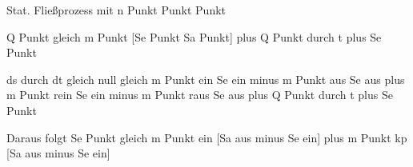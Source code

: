 Stat. Fließprozess mit n Punkt Punkt Punkt

Q Punkt gleich m Punkt [Se Punkt Sa Punkt] plus Q Punkt durch t plus Se Punkt

ds durch dt gleich null gleich m Punkt ein Se ein minus m Punkt aus Se aus plus m Punkt rein Se ein minus m Punkt raus Se aus plus Q Punkt durch t plus Se Punkt

Daraus folgt Se Punkt gleich m Punkt ein [Sa aus minus Se ein] plus m Punkt kp [Sa aus minus Se ein]
